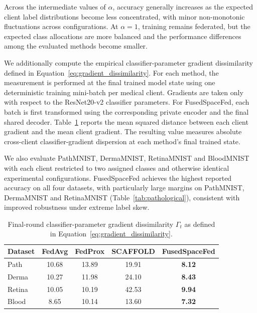 \documentclass[twoside]{article}
\theoremstyle{thmstyleone}%
\theoremstyle{thmstyletwo}%
\theoremstyle{thmstylethree}%
\begin{document}
Across the intermediate values of $\alpha$, accuracy generally increases as the expected client label distributions become less concentrated, with minor non-monotonic fluctuations across configurations. At $\alpha=1$, training
remains federated, but the expected class allocations are more balanced and the performance differences among the evaluated methods become smaller.

We additionally compute the empirical classifier-parameter gradient
dissimilarity defined in Equation~\eqref{eq:gradient_dissimilarity}. For each
method, the measurement is performed at the final trained model state using one
deterministic training mini-batch per medical client. Gradients are taken only
with respect to the ResNet20-v2 classifier parameters. For FusedSpaceFed, each
batch is first transformed using the corresponding private encoder and the
final shared decoder. Table~\ref{tab:gradient} reports the mean squared distance
between each client gradient and the mean client gradient. The resulting value
measures absolute cross-client classifier-gradient dispersion at each method's
final trained state.

We also evaluate PathMNIST, DermaMNIST, RetinaMNIST and BloodMNIST with each
client restricted to two assigned classes and otherwise identical
experimental configurations. FusedSpaceFed achieves the highest reported accuracy on all four
datasets, with particularly large margins on PathMNIST, DermaMNIST and
RetinaMNIST (Table~\ref{tab:pathological}), consistent with improved robustness
under extreme label skew.




\begin{table}[t]
\centering
\caption{Final-round classifier-parameter gradient dissimilarity
$\Gamma_t$ as defined in Equation~\eqref{eq:gradient_dissimilarity}.}
\label{tab:gradient}
\small
\setlength{\tabcolsep}{2pt}
\begin{tabular}{@{}lcccc@{}}
\toprule
Dataset & FedAvg & FedProx & SCAFFOLD & \textbf{FusedSpaceFed} \\
\midrule
Path   & 10.68 & 13.89 & 19.91 & \textbf{8.12} \\
Derma  & 10.27 & 11.98 & 24.10 & \textbf{8.43} \\
Retina & 10.05 & 10.19 & 42.53 & \textbf{9.94} \\
Blood  & 8.65  & 10.14 & 13.60 & \textbf{7.32} \\
\bottomrule
\end{tabular}
\end{table}
\end{document}
